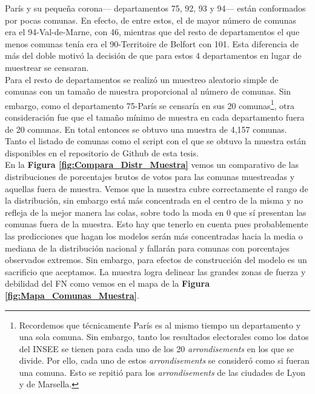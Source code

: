 París y su pequeña corona--- departamentos 75, 92, 93 y 94--- están conformados por pocas comunas. En efecto, de entre estos, el de mayor número de comunas era el 94-Val-de-Marne, con 46, mientras que del resto de departamentos el que menos comunas tenía era el 90-Territoire de Belfort con 101. Esta diferencia de más del doble motivó la decisión de que para estos 4 departamentos en lugar de muestrear se censaran.\\

Para el resto de departamentos se realizó un muestreo aleatorio simple de comunas con un tamaño de muestra proporcional al número de comunas. Sin embargo, como el departamento 75-París se censaría en sus 20 comunas\footnote{Recordemos que técnicamente París es al mismo tiempo un departamento y una sola comuna. Sin embargo, tanto los resultados electorales como los datos del INSEE se tienen para cada uno de los 20 \textit{arrondisements} en los que se divide. Por ello, cada uno de estos \textit{arrondisements} se consideró como si fueran una comuna. Esto se repitió para los \textit{arrondisements} de las ciudades de Lyon y de Marsella.}, otra consideración fue que el tamaño mínimo de muestra en cada departamento fuera de 20 comunas. En total entonces se obtuvo una muestra de 4,157 comunas. Tanto el listado de comunas como el script con el que se obtuvo la muestra están disponibles en el repositorio de Github de esta tesis.\\

En la \textbf{Figura \ref{fig:Compara_Distr_Muestra}} vemos un comparativo de las distribuciones de porcentajes brutos de votos para las comunas muestreadas y aquellas fuera de muestra. Vemos que la muestra cubre correctamente el rango de la distribución, sin embargo está más concentrada en el centro de la misma y no refleja de la mejor manera las colas, sobre todo la moda en 0 que sí presentan las comunas fuera de la muestra. Esto hay que tenerlo en cuenta pues probablemente las predicciones que hagan los modelos serán más concentradas hacia la media o mediana de la distribución nacional y fallarán para comunas con porcentajes observados extremos. Sin embargo, para efectos de construcción del modelo es un sacrificio que aceptamos. La muestra logra delinear las grandes zonas de fuerza y debilidad del FN como vemos en el mapa de la \textbf{Figura \ref{fig:Mapa_Comunas_Muestra}}.\\
 
